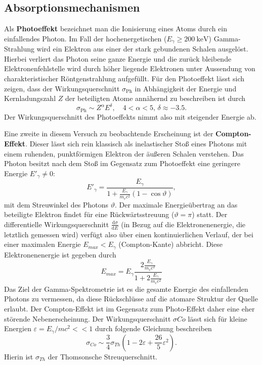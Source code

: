 \subsection{Absorptionsmechanismen}
Als \textbf{Photoeffekt} bezeichnet man die Ionisierung eines Atoms durch ein einfallendes Photon. Im Fall der
hochenergetischen ($E_\gamma \geq  \SI{200}{\kilo\electronvolt}$) Gamma-Strahlung wird ein Elektron aus einer der stark gebundenen Schalen
ausgelöst. Hierbei verliert das Photon seine ganze Energie und die zurück bleibende Elektronenfehlstelle wird durch
höher liegende Elektronen unter Aussendung von charakteristischer Röntgenstrahlung aufgefüllt.
Für den Photoeffekt lässt sich zeigen, dass der Wirkungsquerschnitt $\sigma_{\text{Ph}}$ in Abhängigkeit der Energie und
Kernladungszahl $Z$ der beteiligten Atome annähernd zu beschreiben ist durch
\begin{equation}
    \sigma_{\text{Ph}} \sim Z^{\alpha} E^{\delta}, \quad 4 < \alpha < 5, \, \delta \approx -\num{3.5}.
    \label{eq:wirkungsquerschnitt_photo}
\end{equation}
Der Wirkungsquerschnitt des Photoeffekts nimmt also mit steigender Energie ab.

Eine zweite in diesem Versuch zu beobachtende Erscheinung ist der \textbf{Compton-Effekt}. Dieser lässt sich rein
klassisch als inelastischer Stoß eines Photons mit einem ruhenden, punktförmigen Elektron der äußeren Schalen verstehen.
Das Photon besitzt nach dem Stoß im Gegensatz zum Photoeffekt eine geringere Energie $E'_\gamma \neq 0$:
\begin{equation}
    {E'}_{\!\gamma} = \frac{E_\gamma}{1 + \frac{E_\gamma}{m_e c^2} \left(1 - \cos\vartheta \right)},
    \label{eq:rückstreu}
\end{equation}
mit dem Streuwinkel des Photons $\vartheta$. Der maximale Energieübertrag an das beteiligte Elektron findet für eine
Rückwärtsstreuung ($\vartheta = \pi$) statt. Der differentielle Wirkungsquerschnitt $\frac{\mathup{d}\sigma}{\mathup{d}E}$
(in Bezug auf die Elektronenenergie, die letztlich gemessen wird) verfügt also über einen kontinuierlichen Verlauf, der
bei einer maximalen Energie $E_{max} < E_\gamma$ (Compton-Kante) abbricht. Diese Elektronenenergie ist gegeben durch
\begin{equation}
    E_{max} = E_\gamma \frac{2\frac{E_\gamma}{m_ec^2}}{1 + 2\frac{E_\gamma}{m_ec^2}}
    \label{eq: comptonkante_energie}
\end{equation}
Das Ziel der Gamma-Spektrometrie ist es die
gesamte Energie des einfallenden Photons zu vermessen, da diese Rückschlüsse auf die atomare Struktur der Quelle
erlaubt. Der Compton-Effekt ist im Gegensatz zum Photo-Effekt daher eine eher störende Nebenerscheinung.
Der Wirkungsquerschnitt $\sigma{Co}$ lässt sich für kleine Energien $\varepsilon = E_\gamma / m c^2 << 1$
durch folgende Gleichung beschreiben
\begin{equation}
    \sigma_{Co} \sim \frac{3}{4}\sigma_{Th} \left(1 - 2\varepsilon + \frac{26}{5}\varepsilon^2 \right).
\end{equation}
Hierin ist $\sigma_{Th}$ der Thomsonsche Streuquerschnitt.

